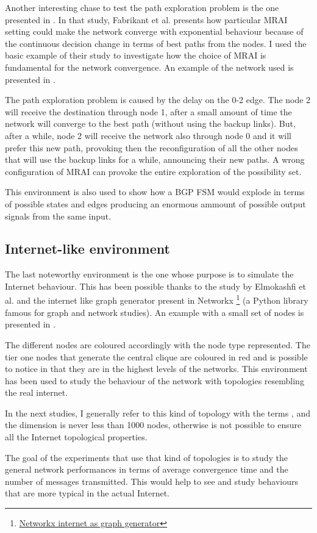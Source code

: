 Another interesting chase to test the path exploration problem is the one
presented in \cite{fabrikant2011there}.
In that study, Fabrikant et al. presents how particular \ac{MRAI} setting could 
make the network converge with exponential behaviour because of the 
continuous decision change in terms of best paths from the nodes. 
I used the basic example of their study to investigate how the choice of \ac{MRAI}
is fundamental for the network convergence.
An example of the network used is presented in .

The path exploration problem is caused by the delay on the \num{0}-\num{2}
edge. The node \num{2} will receive the destination through node \num{1}, after a small amount
of time the network will converge to the best path (without using the backup links).
But, after a while, node \num{2} will receive the network also through node \num{0}
and it will prefer this new path, provoking then the reconfiguration of all
the other nodes that will use the backup links for a while, announcing their 
new paths.
A wrong configuration of \ac{MRAI} can provoke the entire exploration of the 
possibility set.

This environment is also used to show how a \ac{BGP} \ac{FSM} would explode
in terms of possible states and edges producing an enormous ammount of possible
output signals from the same input.

\subsection{Internet-like environment}
\label{subsec:internet_like_env}

The last noteworthy environment is the one whose purpose is to simulate the Internet
behaviour.
This has been possible thanks to the study by Elmokashfi et al. \cite{elmokashfi2010scalability}
and the internet like graph generator present in Networkx \footnote{\href{https://networkx.org/documentation/stable/reference/generated/networkx.generators.internet_as_graphs.random_internet_as_graph.html\#networkx.generators.internet_as_graphs.random_internet_as_graph}{Networkx internet as graph generator}}
(a Python library famous for graph and network studies).
An example with a small set of nodes is presented in .

The different nodes are coloured accordingly with the node type represented.
The tier one nodes that generate the central clique are coloured in red and
is possible to notice in  that they are
in the highest levels of the networks.
This environment has been used to study the behaviour of the network with 
topologies resembling the real internet.

In the next studies, I generally refer to this kind of topology with the 
terms , and the dimension is never less than \num{1000} nodes,
otherwise is not possible to ensure all the Internet topological properties.

The goal of the experiments that use that kind of topologies is to study
the general network performances in terms of average convergence time and 
the number of messages transmitted.
This would help to see and study behaviours that are more typical in the actual
Internet.
